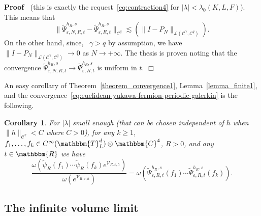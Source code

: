 \documentclass[11pt]{article}
\newenvironment{proof}{\noindent\textbf{Proof\ }}{\hspace*{\fill}$\Box$\medskip}
\newtheorem{corollary}{Corollary}
\begin{document}
\begin{proof}
  (this is exactly the request~{\eqref{eq:contraction4}} for $| \lambda | <
  \lambda_0 (K, L, F)$). This means that
  \[ \| \tilde{\Psi}_{\varepsilon, N, R, t}^{h_R, s} -
     \tilde{\Psi}_{\varepsilon, R, t}^{h_R, s} \|_{\mathcal{C}^q} \lesssim (\|
     I - P_N \|_{\mathcal{L} (\mathcal{C}^{\gamma}, \mathcal{C}^q)}) . \]
  On the other hand, since, \ $\gamma > q$ by assumption, we have $\| I - P_N
  \|_{\mathcal{L} (\mathcal{C}^{\gamma}, \mathcal{C}^q)} \rightarrow 0$ as $N
  \rightarrow + \infty$. The thesis is proven noting that the convergence
  $\tilde{\Psi}_{\varepsilon, N, R, t}^{h_R, s} \rightarrow
  \tilde{\Psi}_{\varepsilon, R, t}^{h_R, s}$ is uniform in $t$.
\end{proof}

An easy corollary of Theorem~\ref{theorem_convergence1},
Lemma~\ref{lemma_finite1}, and the
convergence~{\eqref{eq:euclidean-yukawa-fermion-periodic-galerkin}} is the
following.

\begin{corollary}
  \label{corollary_formula}For $| \lambda |$ small enough (that can be chosen
  independent of $h$ when $\| h \|_{\mathcal{C}^{\gamma}} < C$ where $C > 0$),
  for any $k \geqslant 1$, $f_1, \ldots, f_k \in C^{\infty} (\mathbbm{T}^d_L)
  \otimes \mathbbm{C}^4$, $R > 0$, and any $t \in \mathbbm{R}$ we have
  \[ \frac{\omega (\tilde{\psi}_R (f_1) \cdots \tilde{\psi}_R (f_k)
     e^{\mathcal{V}_{R, \varepsilon, h}})}{\omega (e^{\mathcal{V}_{R,
     \varepsilon, h}})} = \omega (\tilde{\Psi}_{\varepsilon, R, t}^{h_R, s}
     (f_1) \cdots \tilde{\Psi}_{\varepsilon, R, t}^{h_R, s} (f_k)) . \]
\end{corollary}

\subsection{The infinite volume limit}\label{eq:yukawa-infinite-vol}
\end{document}

